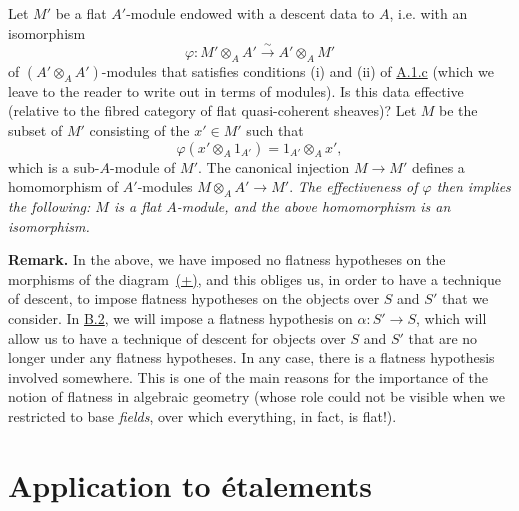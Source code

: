 \documentclass{article}
\newenvironment{rmenv}[1]
  {\phantomsection\par\medskip\noindent\textbf{#1.}\rmfamily}
  {\medskip}
\newcommand{\oldpage}[1]{\marginpar{\footnotesize$\Big\vert$ \textit{p.~#1}}}
\begin{document}
Let $M'$ be a flat $A'$-module endowed with a descent data to $A$, i.e. with an isomorphism
\[
  \varphi\colon M'\otimes_A A' \xrightarrow{\sim} A'\otimes_A M'
\]
of $(A'\otimes_A A')$-modules that satisfies conditions (i) and (ii) of \hyperref[A.1.c]{A.1.c} (which we leave to the reader to write out in terms of modules).
Is this data effective (relative to the fibred category of flat quasi-coherent sheaves)?
Let $M$ be the subset of $M'$ consisting of the $x'\in M'$ such that
\[
  \varphi(x'\otimes_A 1_{A'}) = 1_{A'}\otimes_A x',
\]
which is a sub-$A$-module of $M'$.
The canonical injection $M\to M'$ defines a homomorphism of $A'$-modules $M\otimes_A A'\to M'$.
\emph{The effectiveness of $\varphi$ then implies the following: $M$ is a flat $A$-module, and the above homomorphism is an isomorphism.}

\begin{rmenv}{Remark}
  In the above, we have imposed no flatness hypotheses on the morphisms of the diagram~\hyperref[equation-example:A.2.b]{(+)}, and this obliges us, in order to have a technique of descent, to impose flatness hypotheses on the objects over $S$ and $S'$ that we consider.
  In \hyperref[B.2]{B.2}, we will impose a flatness hypothesis on $\alpha\colon S'\to S$, which will allow us to have a technique of descent for objects over $S$ and $S'$ that are no longer under any flatness hypotheses.
  In any case, there is a flatness hypothesis involved somewhere.
  This is one of the main reasons for the importance of the notion of flatness in algebraic geometry (whose role could not be visible when we restricted to base \emph{fields}, over which everything, in fact, is flat!).
\end{rmenv}


\oldpage{190-10}
\section{Application to \'{e}talements}
\label{A.3}
\end{document}
